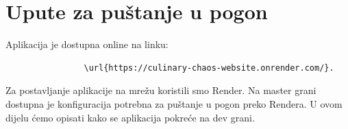 			\eject 
		
		\section{Upute za puštanje u pogon}
		
		
			
			
			
			\noindent Aplikacija je dostupna online na linku:
			\begin{verbatim}
				\url{https://culinary-chaos-website.onrender.com/}.
			\end{verbatim}
			\noindent Za postavljanje aplikacije na mrežu koristili smo Render. Na master grani dostupna je konfiguracija potrebna za puštanje u pogon preko Rendera. U ovom dijelu ćemo opisati kako se aplikacija pokreće na dev grani.

